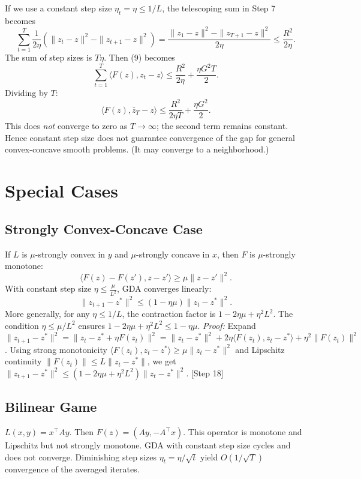 \documentclass{article}
\begin{document}
If we use a constant step size $\eta_t = \eta \le 1/L$, the telescoping sum in Step 7 becomes
\[
\sum_{t=1}^T \frac{1}{2\eta} \left( \|z_t - z\|^2 - \|z_{t+1} - z\|^2 \right) = \frac{\|z_1 - z\|^2 - \|z_{T+1} - z\|^2}{2\eta} \le \frac{R^2}{2\eta}.
\]
The sum of step sizes is $T\eta$. Then (9) becomes
\[
\sum_{t=1}^T \langle F(z), z_t - z \rangle \le \frac{R^2}{2\eta} + \frac{\eta G^2 T}{2}.
\]
Dividing by $T$:
\[
\langle F(z), \bar{z}_T - z \rangle \le \frac{R^2}{2\eta T} + \frac{\eta G^2}{2}.
\]
This does \textit{not} converge to zero as $T \to \infty$; the second term remains constant. Hence constant step size does not guarantee convergence of the gap for general convex-concave smooth problems. (It may converge to a neighborhood.)

\section*{Special Cases}

\subsection*{Strongly Convex-Concave Case} \label{sec:strongly-convex}
If $L$ is $\mu$-strongly convex in $y$ and $\mu$-strongly concave in $x$, then $F$ is $\mu$-strongly monotone:
\[
\langle F(z) - F(z'), z - z' \rangle \ge \mu \|z - z'\|^2.
\]
With constant step size $\eta \le \frac{\mu}{L^2}$, GDA converges linearly:
\[
\|z_{t+1} - z^*\|^2 \le (1 - \eta \mu) \|z_t - z^*\|^2.
\]
More generally, for any $\eta \le 1/L$, the contraction factor is $1 - 2\eta\mu + \eta^2 L^2$. The condition $\eta \le \mu/L^2$ ensures $1 - 2\eta\mu + \eta^2 L^2 \le 1 - \eta\mu$.
\textit{Proof:} Expand $\|z_{t+1} - z^*\|^2 = \|z_t - z^* + \eta F(z_t)\|^2 = \|z_t - z^*\|^2 + 2\eta \langle F(z_t), z_t - z^* \rangle + \eta^2 \|F(z_t)\|^2$. Using strong monotonicity $\langle F(z_t), z_t - z^* \rangle \ge \mu \|z_t - z^*\|^2$ and Lipschitz continuity $\|F(z_t)\| \le L \|z_t - z^*\|$, we get $\|z_{t+1} - z^*\|^2 \le (1 - 2\eta\mu + \eta^2 L^2) \|z_t - z^*\|^2$. [Step 18]

\subsection*{Bilinear Game}
$L(x,y) = x^\top A y$. Then $F(z) = (A y, -A^\top x)$. This operator is monotone and Lipschitz but not strongly monotone. GDA with constant step size cycles and does not converge. Diminishing step sizes $\eta_t = \eta/\sqrt{t}$ yield $O(1/\sqrt{T})$ convergence of the averaged iterates.
\end{document}
